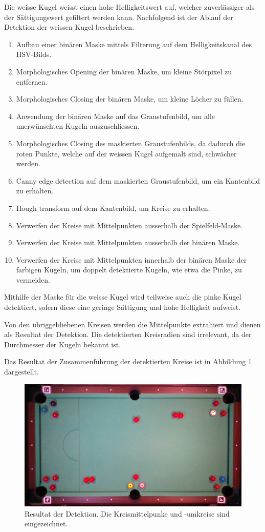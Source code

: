 Die weisse Kugel weisst einen hohe Helligkeitswert auf, welcher zuverlässiger als der Sättigungswert gefiltert werden kann.
Nachfolgend ist der Ablauf der Detektion der weissen Kugel beschrieben.

\begin{enumerate}
  \item Aufbau einer binären Maske mittels Filterung auf dem Helligkeitskanal des HSV-Bilds.
  \item Morphologisches Opening der binären Maske, um kleine Störpixel zu entfernen.
  \item Morphologisches Closing der binären Maske, um kleine Löcher zu füllen.
  \item Anwendung der binären Maske auf das Graustufenbild, um alle unerwünschten Kugeln auszuschliessen.
  \item Morphologisches Closing des maskierten Graustufenbilds, da dadurch die roten Punkte,
  welche auf der weissen Kugel aufgemalt sind, schwächer werden.
  \item Canny edge detection auf dem maskierten Graustufenbild, um ein Kantenbild zu erhalten.
  \item Hough transform auf dem Kantenbild, um Kreise zu erhalten.
  \item Verwerfen der Kreise mit Mittelpunkten ausserhalb der Spielfeld-Maske.
  \item Verwerfen der Kreise mit Mittelpunkten ausserhalb der binären Maske.
  \item Verwerfen der Kreise mit Mittelpunkten innerhalb der binären Maske der farbigen Kugeln, um doppelt detektierte Kugeln, wie etwa die Pinke, zu vermeiden.
\end{enumerate}

Mithilfe der Maske für die weisse Kugel wird teilweise auch die pinke Kugel detektiert,
sofern diese eine geringe Sättigung und hohe Helligkeit aufweist.

Von den übriggebliebenen Kreisen werden die Mittelpunkte extrahiert und dienen als Resultat der Detektion.
Die detektierten Kreisradien sind irrelevant, da der Durchmesser der Kugeln bekannt ist.

Das Resultat der Zusammenführung der detektierten Kreise ist in Abbildung \ref{fig:hough_result} dargestellt.

\begin{figure}[h!]
    \begin{center}
    \includegraphics[width=0.8\linewidth]{../common/resources/detection/hough.png}
    \end{center}
    \caption{Resultat der Detektion. Die Kreismittelpunke und -umkreise sind eingezeichnet.}
    \label{fig:hough_result}
\end{figure}
